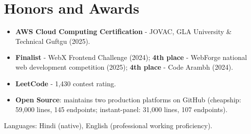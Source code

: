 \documentclass[11pt,a4paper,sans]{moderncv}
\begin{document}

\section{Honors and Awards}
\vspace{1pt}
\begin{itemize}
    \item {\textbf{AWS Cloud Computing Certification} - JOVAC, GLA University \& Technical Guftgu (2025).}
    \item {\textbf{Finalist} - WebX Frontend Challenge (2024); \textbf{4th place} - WebForge national web development competition (2025); \textbf{4th place} - Code Arambh (2024).}
    \item {\textbf{LeetCode} - 1,430 contest rating.}
    \item {\textbf{Open Source}: maintains two production platforms on GitHub (cheapship: 59,000 lines, 145 endpoints; instant-panel: 31,000 lines, 107 endpoints).}
\end{itemize}


\vspace{2pt}
\small{Languages: Hindi (native), English (professional working proficiency).}
\end{document}
